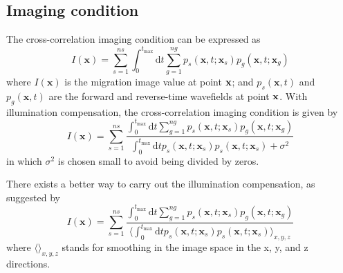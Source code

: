 \subsection{Imaging condition}\label{sec:imaging_condition}
The cross-correlation imaging condition can be expressed as
\begin{equation}
I(\textbf{x})=\sum_{s=1}^{ns}\int_{0}^{t_{\max}}\mathrm{d}t \sum_{g=1}^{ng} p_s(\textbf{x},t;\textbf{x}_s)p_g(\textbf{x},t;\textbf{x}_g)
\end{equation}
where $I(\textbf{x})$ is the migration image value at point ${\bf x}$; and $p_s(\textbf{x},t)$ and $p_g(\textbf{x},t)$ are the forward and reverse-time wavefields at point ${\bf x}$. With illumination compensation, the cross-correlation imaging condition is given by
\begin{equation}
I(\textbf{x})=\sum_{s=1}^{ns}\frac{\int_{0}^{t_{\max}}\mathrm{d}t\sum_{g=1}^{ng} p_s(\textbf{x},t;\textbf{x}_s)p_g(\textbf{x},t;\textbf{x}_g)}{\int_{0}^{t_{\max}}\mathrm{d}t p_s(\textbf{x},t;\textbf{x}_s)p_s(\textbf{x},t;\textbf{x}_s)+\sigma^2}
\end{equation}
in which $\sigma^2$ is chosen small to avoid being divided by zeros. 

There exists a better way to carry out the illumination compensation, as suggested by \cite{guitton2007smoothing}
\begin{equation}
I(\textbf{x})=\sum_{s=1}^{ns}\frac{\int_{0}^{t_{\max}}\mathrm{d}t\sum_{g=1}^{ng} p_s(\textbf{x},t;\textbf{x}_s)p_g(\textbf{x},t;\textbf{x}_g)}{\langle\int_{0}^{t_{\max}}\mathrm{d}t p_s(\textbf{x},t;\textbf{x}_s)p_s(\textbf{x},t;\textbf{x}_s)\rangle_{x,y,z}}
\end{equation}
where $\langle\rangle_{x,y,z}$ stands for smoothing in the image space in the x, y, and z directions.


